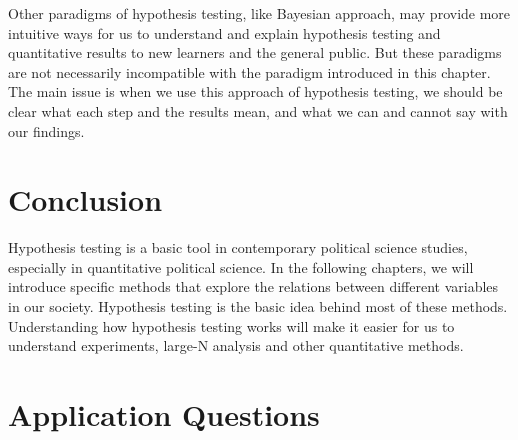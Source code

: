 \documentclass{book}
\begin{document}
Other paradigms of hypothesis testing, like Bayesian approach, may provide
more intuitive ways for us to understand and explain hypothesis testing and
quantitative results to new learners and the general public. But these
paradigms are not necessarily incompatible with the paradigm introduced in
this chapter. The main issue is when we use this approach of hypothesis
testing, we should be clear what each step and the results mean, and what we
can and cannot say with our findings.

\hypertarget{conclusion-3}{%
\section{Conclusion}\label{conclusion-3}}

Hypothesis testing is a basic tool in contemporary political science studies,
especially in quantitative political science. In the following chapters, we
will introduce specific methods that explore the relations between different
variables in our society. Hypothesis testing is the basic idea behind most of
these methods. Understanding how hypothesis testing works will make it easier
for us to understand experiments, large-N analysis and other quantitative
methods.

\hypertarget{application-questions-3}{%
\section{Application Questions}\label{application-questions-3}}
\end{document}

